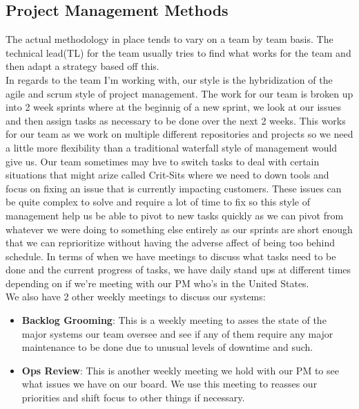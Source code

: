\documentclass[11pt]{article} %
\begin{document}
\subsection{Project Management Methods}
The actual methodology in place tends to vary on a team by team basis. The technical lead(TL) for the team usually tries to find what works for the team and then adapt a strategy based off this. \\ In regards to the team I'm working with, our style is the hybridization of the agile and scrum style of project management. The work for our team is broken up into 2 week sprints where at the beginnig of a new sprint, we look at our issues and then assign tasks as necessary to be done over the next 2 weeks. This works for our team as we work on multiple different repositories and projects so we need a little more flexibility than a traditional waterfall style of management would give us. Our team sometimes may hve to switch tasks to deal with certain situations that might arize called Crit-Sits where we need to down tools and focus on fixing an issue that is currently impacting customers. These issues can be quite complex to solve and require a lot of time to fix so this style of management help us be able to pivot to new tasks quickly as we can pivot from whatever we were doing to something else entirely as our sprints are short enough that we can reprioritize without having the adverse affect of being too behind schedule. In terms of when we have meetings to discuss what tasks need to be done and the current progress of tasks, we have daily stand ups at different times depending on if we're meeting with our PM who's in the United States. \\ We also have 2 other weekly meetings to discuss our systems: \begin{itemize} \item \textbf{Backlog Grooming}: This is a weekly meeting to asses the state of the major systems our team oversee and see if any of them require any major maintenance to be done due to unusual levels of downtime and such. \item \textbf{Ops Review}: This is another weekly meeting we hold with our PM to see what issues we have on our board. We use this meeting to reasses our priorities and shift focus to other things if necessary. \\ \end{itemize} 
\end{document}
